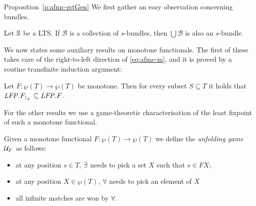 \begin{proofof}{Proposition~\ref{p:afmc-rstGen}}
We first %
gather an easy observation concerning 
bundles.

%
\begin{claimfirst}
\label{p:bundle}
Let $\mathbb{S}$ be a LTS. If $\mathcal{B}$ is a collection of $s$-bundles, 
then $\bigcup \mathcal{B}$ is also an $s$-bundle.
\end{claimfirst}

We now states some auxiliary results on monotone functionals.
The first of these takes care of the right-to-left direction of
\eqref{eq:afmc-m}, and it is proved by a routine transfinite induction argument:
\begin{claimfirst}
\label{p:afmc-1}
Let $F:  \wp(T)\to \wp(T)$ be monotone.
Then for every subset $S \subseteq T$ it holds that $\mathit{LFP}. F_{{\upharpoonright}_{S}\,}\subseteq \mathit{LFP}.F$.
\end{claimfirst}

%
For the other results we use a game-theoretic characterisation of the least 
fixpoint of such a monotone functional.

\begin{definition}
\label{d:unfgame}
Given a monotone functional $F: \wp(T)\to \wp(T)$ we define the 
\emph{unfolding game} $\mathcal{U}_{F}$ as follows:
\begin{itemize}
\item at any position $s \in T$, $\exists$ needs to pick a set $X$ such that 
$s \in FX$;
\item at any position $X \in \wp(T)$, $\forall$ needs to pick an element of 
$X$
\item all infinite matches are won by $\forall$.
\end{itemize}



\end{definition}
\end{proofof}
